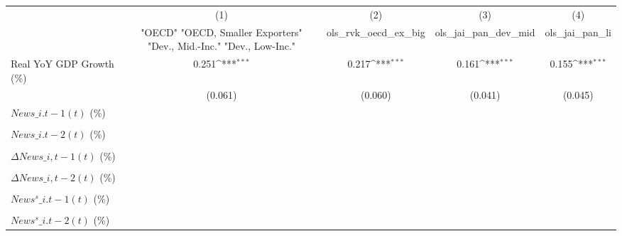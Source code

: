 {
\def\sym#1{\ifmmode^{#1}\else\(^{#1}\)\fi}
\begin{tabular}{l*{4}{c}}
\toprule
                    &\multicolumn{1}{c}{(1)}&\multicolumn{1}{c}{(2)}&\multicolumn{1}{c}{(3)}&\multicolumn{1}{c}{(4)}\\
                    &\multicolumn{1}{c}{ "OECD" "OECD, Smaller Exporters" "Dev., Mid.-Inc." "Dev., Low-Inc."}&\multicolumn{1}{c}{ols\_rvk\_oecd\_ex\_big}&\multicolumn{1}{c}{ols\_jai\_pan\_dev\_mid}&\multicolumn{1}{c}{ols\_jai\_pan\_li}\\
\midrule
Real YoY GDP Growth (\%)&       0.251\sym{***}&       0.217\sym{***}&       0.161\sym{***}&       0.155\sym{***}\\
                    &     (0.061)         &     (0.060)         &     (0.041)         &     (0.045)         \\
\addlinespace
$ News\_{i.t-1}(t)$ (\%)&                     &                     &                     &                     \\
                    &                     &                     &                     &                     \\
\addlinespace
$ News\_{i.t-2}(t)$ (\%)&                     &                     &                     &                     \\
                    &                     &                     &                     &                     \\
\addlinespace
$ \Delta News\_{i,t-1}(t)$ (\%)&                     &                     &                     &                     \\
                    &                     &                     &                     &                     \\
\addlinespace
$ \Delta News\_{i,t-2}(t)$ (\%)&                     &                     &                     &                     \\
                    &                     &                     &                     &                     \\
\addlinespace
$ News^s\_{i.t-1}(t)$ (\%)&                     &                     &                     &                     \\
                    &                     &                     &                     &                     \\
\addlinespace
$ News^s\_{i.t-2}(t)$ (\%)&                     &                     &                     &                     \\

\end{tabular}}
